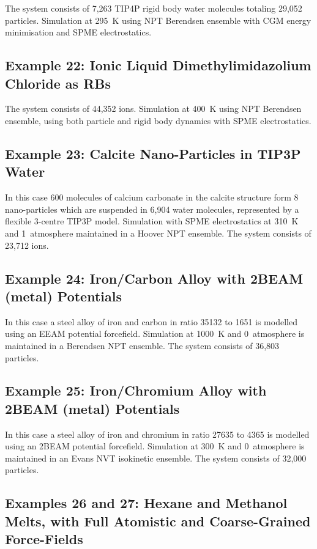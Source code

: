 The system consists of 7,263 TIP4P rigid body water molecules totaling
29,052 particles.  Simulation at 295~K using NPT Berendsen ensemble with
CGM energy minimisation and SPME electrostatics.

\subsection{Example 22: Ionic Liquid Dimethylimidazolium Chloride as RBs}

The system consists of 44,352 ions.  Simulation at 400~K using NPT
Berendsen ensemble, using both particle and rigid body dynamics with SPME electrostatics.

\subsection{Example 23: Calcite Nano-Particles in TIP3P Water}

In this case 600 molecules of calcium carbonate in the calcite
structure form 8 nano-particles which are suspended in 6,904 water
molecules, represented by a flexible 3-centre TIP3P model.  Simulation
with SPME electrostatics at 310~K and 1~atmosphere maintained in
a Hoover NPT ensemble.  The system consists of 23,712 ions.

\subsection{Example 24: Iron/Carbon Alloy with 2BEAM (metal) Potentials}

In this case a steel alloy of iron and carbon in ratio
35132 to 1651 is modelled using an EEAM potential forcefield.
Simulation at 1000~K and 0~atmosphere is maintained in a
Berendsen NPT ensemble.  The system consists of 36,803 particles.

\subsection{Example 25: Iron/Chromium Alloy with 2BEAM (metal) Potentials}

In this case a steel alloy of iron and chromium in ratio
27635 to 4365 is modelled using an 2BEAM potential forcefield.
Simulation at 300~K and 0~atmosphere is maintained in an Evans NVT
isokinetic ensemble.  The system consists of 32,000 particles.

\subsection{Examples 26 and 27: Hexane and Methanol Melts, with
Full Atomistic and Coarse-Grained Force-Fields}


